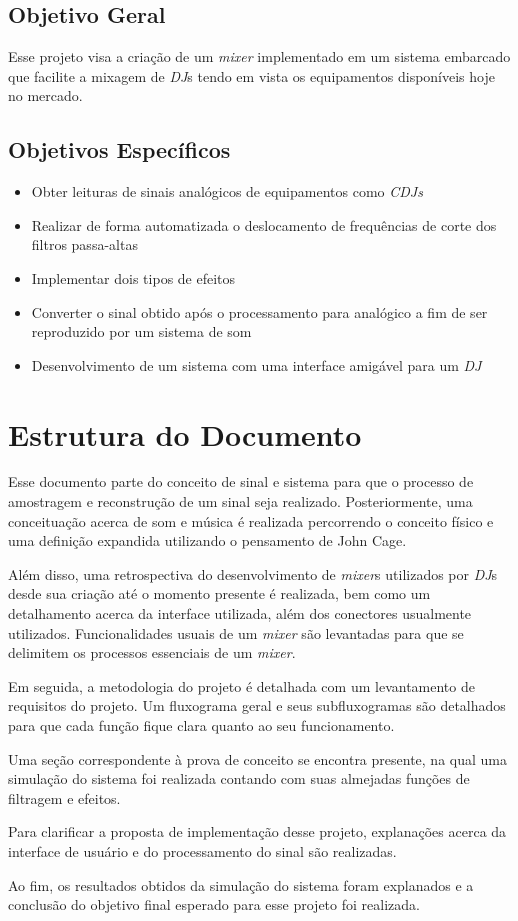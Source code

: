 \subsection{Objetivo Geral}
Esse projeto visa a criação de um \textit{mixer} implementado em um sistema embarcado que facilite a mixagem de \textit{DJ}s tendo em vista os equipamentos disponíveis hoje no mercado.

\subsection{Objetivos Específicos}
\begin{itemize}
    \item Obter leituras de sinais analógicos de equipamentos como \textit{CDJs}
    \item Realizar de forma automatizada o deslocamento de frequências de corte dos filtros passa-altas
    \item Implementar dois tipos de efeitos
    \item Converter o sinal obtido após o processamento para analógico a fim de ser reproduzido por um sistema de som
    \item Desenvolvimento de um sistema com uma interface amigável para um \textit{DJ}
\end{itemize}

\section{Estrutura do Documento}

Esse documento parte do conceito de sinal e sistema para que o processo de amostragem e reconstrução de um sinal seja realizado. Posteriormente, uma conceituação acerca de som e música é realizada percorrendo o conceito físico e uma definição expandida utilizando o pensamento de John Cage.

Além disso, uma retrospectiva do desenvolvimento de \textit{mixer}s utilizados por \textit{DJ}s desde sua criação até o momento presente é realizada, bem como um detalhamento acerca da interface utilizada, além dos conectores usualmente utilizados. Funcionalidades usuais de um \textit{mixer} são levantadas para que se delimitem os processos essenciais de um \textit{mixer}.

Em seguida, a metodologia do projeto é detalhada com um levantamento de requisitos do projeto. Um fluxograma geral e seus subfluxogramas são detalhados para que cada função fique clara quanto ao seu funcionamento.

Uma seção correspondente à prova de conceito se encontra presente, na qual uma simulação do sistema foi realizada contando com suas almejadas funções de filtragem e efeitos.

Para clarificar a proposta de implementação desse projeto, explanações acerca da interface de usuário e do processamento do sinal são realizadas.

Ao fim, os resultados obtidos da simulação do sistema foram explanados e a conclusão do objetivo final esperado para esse projeto foi realizada.
